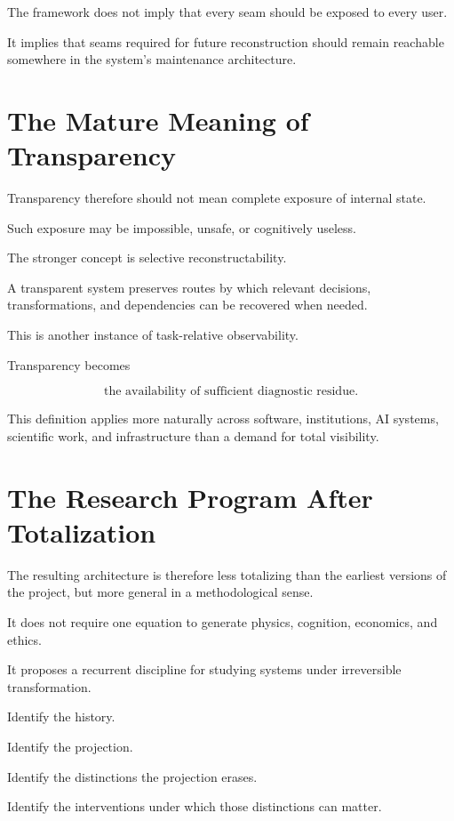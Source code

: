 \documentclass[11pt]{article}
\theoremstyle{remark}
\begin{document}
The framework does not imply that every seam should be exposed to every user.

It implies that seams required for future reconstruction should remain reachable somewhere in the system's maintenance architecture.

\section{The Mature Meaning of Transparency}

Transparency therefore should not mean complete exposure of internal state.

Such exposure may be impossible, unsafe, or cognitively useless.

The stronger concept is selective reconstructability.

A transparent system preserves routes by which relevant decisions, transformations, and dependencies can be recovered when needed.

This is another instance of task-relative observability.

Transparency becomes

\begin{equation}
\text{the availability of sufficient diagnostic residue}.
\end{equation}

This definition applies more naturally across software, institutions, AI systems, scientific work, and infrastructure than a demand for total visibility.

\section{The Research Program After Totalization}

The resulting architecture is therefore less totalizing than the earliest versions of the project, but more general in a methodological sense.

It does not require one equation to generate physics, cognition, economics, and ethics.

It proposes a recurrent discipline for studying systems under irreversible transformation.

Identify the history.

Identify the projection.

Identify the distinctions the projection erases.

Identify the interventions under which those distinctions can matter.
\end{document}
